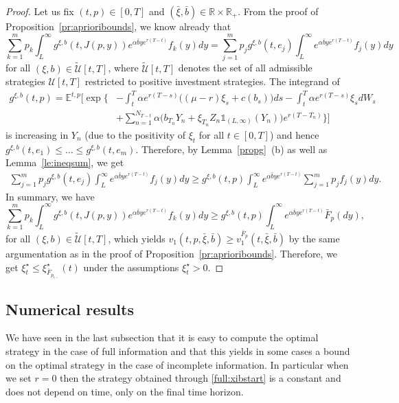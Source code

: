 \documentclass[reqno, 11pt]{amsart}%
\newcommand{\R}{\mathbb{R}}
\newcommand{\Eop}{\mathbb{E}}
\theoremstyle{definition}
\numberwithin{equation}{section} \numberwithin{theorem}{section}
\begin{document}
\begin{proof}
   Let us fix $(t,p)\in[0,T]$ and $(\bar\xi,\bar b)\in\R\times\R_+$. From the proof of Proposition~\ref{pr:aprioribounds}, we know already that
   \begin{equation*}
   \sum_{k=1}^{m}p_k\int_L^\infty g^{\xi,b}(t,J(p,y))e^{\alpha\bar b y e^{r(T-t)}}f_k(y)dy
   = \sum_{j=1}^{m}p_j g^{\xi,b}(t,e_j) \int_L^\infty e^{\alpha \bar b y e^{r(T-t)}}f_j(y)dy
   \end{equation*}
   for all $(\xi,b)\in\widetilde{\mathcal{U}}[t,T]$, where $\widetilde{\mathcal{U}}[t,T]$ denotes the set of all admissible strategies $\mathcal{U}[t,T]$ restricted to positive investment strategies. The integrand of
   \begin{align*}
   g^{\xi,b}(t,p) = \Eop^{t,p}\bigg[\exp\bigg\{&-\int_t^T\alpha e^{r(T-s)}\big((\mu-r)\xi_s+c(b_s)\big) ds -\int_t^T\alpha e^{r(T-s)}\xi_s dW_s\\
   &+\sum_{n=1}^{N_{T-t}}\alpha \big(b_{T_n}Y_n+\xi_{T_n} Z_n\mathds{1}_{(L,\infty)}(Y_n)\big)e^{r(T-T_n)}\bigg\}\bigg]
   \end{align*}
   is increasing in $Y_n$ (due to the positivity of $\xi_t$ for all $t\in[0,T]$) and hence $g^{\xi,b}(t,e_1)\le \ldots\le g^{\xi,b}(t,e_m)$.
   Therefore, by Lemma~\ref{propg}~(b) as well as Lemma~\ref{le:ineqsum}, we get
   \begin{align*}
   \sum_{j=1}^{m}p_j g^{\xi,b}(t,e_j) \int_L^\infty e^{\alpha \bar b y e^{r(T-t)}}f_j(y)dy
   \ge g^{\xi,b}(t,p) \int_L^\infty e^{\alpha \bar b y e^{r(T-t)}}\sum_{j=1}^m p_j f_j(y)dy.
   \end{align*}
   In summary, we have 
   \begin{equation*}
   \sum_{k=1}^{m}p_k\int_L^\infty g^{\xi,b}(t,J(p,y))e^{\alpha\bar b y e^{r(T-t)}}f_k(y)dy
   \ge g^{\xi,b}(t,p) \int_L^\infty e^{\alpha \bar b y e^{r(T-t)}}\bar F_p(dy),
   \end{equation*}
   for all $(\xi,b)\in\widetilde{\mathcal{U}}[t,T]$, which yields $v_1(t,p,\bar\xi,\bar b)\ge v_1^{\bar F_p}(t,\bar\xi,\bar b)$ by the same argumentation as in the proof of Proposition~\ref{pr:aprioribounds}. Therefore, we get $\xi_t^\star \le \xi^\star_{\bar F_{p_{t-}}}(t)$ under the assumptions $\xi_t^\star>0$.
\end{proof}

\subsection{Numerical results}
We have seen in the last subsection that it is easy to compute the optimal strategy in the case of full information and that this yields in some cases a bound on the optimal strategy in the case of  incomplete information.  In particular when we set $r=0$ then the strategy obtained through \eqref{full:xibstart} is a constant and does not depend on time, only on the final time horizon.
\end{document}
